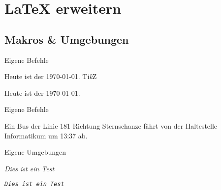 \documentclass{beamer}
\begin{document}

		\section{\LaTeX{} erweitern}
		\subsection{Makros \& Umgebungen}
		\begin{frame}[containsverbatim]{Eigene Befehle}
			\begin{latexcode}
\def\heute{Heute ist der \today.}
\newcommand{\heute}{Heute ist der \today.}
\newcommand{\TikZ}{Ti\textit{k}Z}
\heute
\TikZ
			\end{latexcode}
			Heute ist der \today.\\
			\TikZ
		\end{frame}


		\begin{frame}[containsverbatim]{Eigene Befehle}
			\begin{latexcode}
\newcommand{\bus}[4]{Ein Bus der Linie #1 Richtung
                    #2 fährt von der Haltestelle
                    #3 um #4 ab.}
\bus{181}{Sternschanze}{Informatikum}{13:37}
			\end{latexcode}
		\end{frame}


		\begin{frame}[containsverbatim]{Eigene Umgebungen}
			\begin{latexcode}
\newenvironment{textttit}
               {\begingroup\ttfamily\itshape}
               {\endgroup}
\begin{textttit}
	Dies ist ein Test
\end{textttit}
			\end{latexcode}
			\texttt{\textit{Dies ist ein Test}}
		\end{frame}
		
\end{document}

